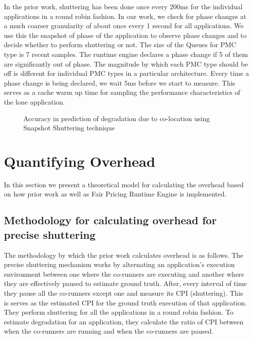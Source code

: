 \documentclass[pageno]{jpaper}
\begin{document}
In the prior work, shuttering has been done once every 200ms for the individual applications in a round robin fashion. In our work, we check for phase changes at a much coarser granularity of about once every 1 second for all applications. We use this the snapshot of phase of the application to observe phase changes and to decide whether to perform shuttering or not. The size of the Queues for PMC type is 7 recent samples. The runtime engine declares a phase change if 5 of them are significantly out of phase. The magnitude by which each PMC type should be off is different for individual PMC types in a particular architecture. Every time a phase change is being declared, we wait 5ms before we start to measure. This serves as a cache warm up time for sampling the performance characteristics of the lone application.
\begin{figure*}
\centering
\begin{minipage}[t]{2\columnwidth}
\centering
{}
\caption{Accuracy in prediction of degradation due to co-location using Snapshot Shuttering technique}
\label{fig:accuracy}
\end{minipage}
\end{figure*}
\section{Quantifying Overhead}
\label{sec:QuantifyingOverhead}

In this section we present a theoretical model for calculating the overhead based on how prior work as well as Fair Pricing Runtime Engine is implemented.
\subsection{Methodology for calculating overhead for precise shuttering}
\label{subsec:Methodologyforcalculatingoverheadforpreciseshuttering}

The methodology by which the prior work calculates overhead is as follows. The precise shuttering mechanism works by alternating an application's execution environment between one where the co-runners are executing and another where they are effectively paused to estimate ground truth. After, every interval of time they pause all the co-runners except one and measure its CPI (shuttering). This is serves as the estimated CPI for the ground truth execution of that application. They perform shuttering for all the applications in a round robin fashion. To estimate degradation for an application, they calculate the ratio of CPI between when the co-runners are running and when the co-runners are paused. 
\end{document}
